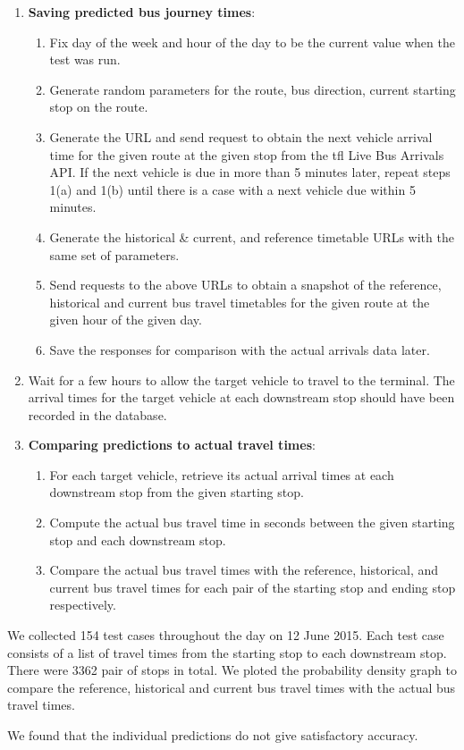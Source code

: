 \begin{enumerate}
  \item \textbf{Saving predicted bus journey times}:
  \begin{enumerate}
    \item Fix day of the week and hour of the day to be the current value when the test was run.
    \item Generate random parameters for the route, bus direction, current starting stop on the route.
    \item Generate the URL and send request to obtain the next vehicle arrival time for the given route at the given stop from the \acrshort{tfl} Live Bus Arrivals API. If the next vehicle is due in more than 5 minutes later, repeat steps 1(a) and 1(b) until there is a case with a next vehicle due within 5 minutes.
    \item  Generate the historical \& current, and reference timetable URLs with the same set of parameters.
    \item Send requests to the above URLs to obtain a snapshot of the reference, historical and current bus travel timetables for the given route at the given hour of the given day.
    \item Save the responses for comparison with the actual arrivals data later.
  \end{enumerate}
  \item Wait for a few hours to allow the target vehicle to travel to the terminal. The arrival times for the target vehicle at each downstream stop should have been recorded in the database.
  \item \textbf{Comparing predictions to actual travel times}:
  \begin{enumerate}
    \item For each target vehicle, retrieve its actual arrival times at each downstream stop from the given starting stop.
    \item Compute the actual bus travel time in seconds between the given starting stop and each downstream stop.
    \item Compare the actual bus travel times with the reference, historical, and current bus travel times for each pair of the starting stop and ending stop respectively.
  \end{enumerate}
\end{enumerate}

\par We collected 154 test cases throughout the day on 12 June 2015. Each test case consists of a list of travel times from the starting stop to each downstream stop. There were 3362 pair of stops in total. We ploted the probability density graph to compare the reference, historical and current bus travel times with the actual bus travel times.

\par We found that the individual predictions do not give satisfactory accuracy.



